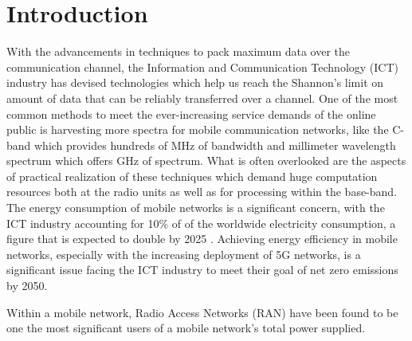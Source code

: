 \section{Introduction}
\label{sec:intro}


With the advancements in techniques to pack maximum data over the communication channel, the Information and Communication Technology (ICT) industry has devised technologies which help us reach the Shannon’s limit on amount of data that can be reliably transferred over a channel. 
One of the most common methods to meet the ever-increasing service demands of the online public is harvesting more spectra for mobile communication networks, like the C-band which provides hundreds of MHz of bandwidth and millimeter wavelength spectrum which offers GHz of spectrum. 
What is often overlooked are the aspects of practical realization of these techniques which demand huge computation resources both at the radio units as well as for processing within the base-band. 
The energy consumption of mobile networks is a significant concern, with the ICT industry accounting for 10\% of of the worldwide electricity consumption, a figure that is expected to double by 2025 \cite{ict-energy}.
Achieving energy efficiency in mobile networks, especially with the increasing deployment of 5G networks, is a significant issue facing the ICT industry to meet their goal of net zero emissions by 2050. 

Within a mobile network, Radio Access Networks (RAN) have been found to be one the most significant users of a mobile network's total power supplied\cite{ict1, ict2}.

